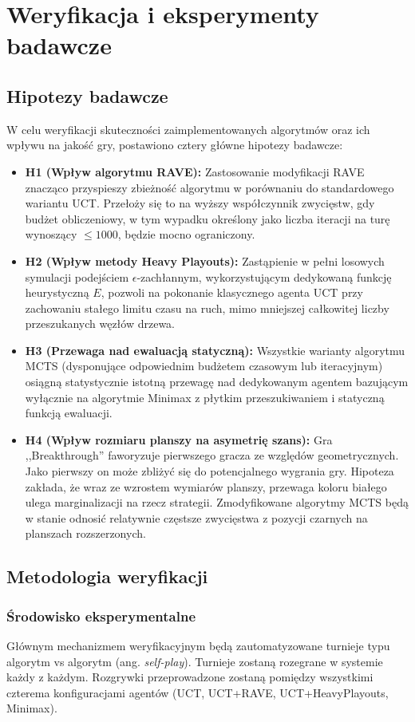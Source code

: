 \documentclass{article}
\begin{document}
\newpage
\section{Weryfikacja i eksperymenty badawcze}
\subsection{Hipotezy badawcze}
W celu weryfikacji skuteczności zaimplementowanych algorytmów oraz ich wpływu na jakość gry, postawiono cztery główne hipotezy badawcze:

\begin{itemize}
    \item \textbf{H1 (Wpływ algorytmu RAVE):} Zastosowanie modyfikacji RAVE znacząco przyspieszy zbieżność algorytmu w porównaniu do standardowego wariantu UCT. Przełoży się to na wyższy współczynnik zwycięstw, gdy budżet obliczeniowy, w tym wypadku określony jako liczba iteracji na turę wynoszący $\le 1000$, będzie mocno ograniczony.
    \item \textbf{H2 (Wpływ metody Heavy Playouts):} Zastąpienie w pełni losowych symulacji podejściem $\epsilon$-zachłannym, wykorzystującym dedykowaną funkcję heurystyczną $E$, pozwoli na pokonanie klasycznego agenta UCT przy zachowaniu stałego limitu czasu na ruch, mimo mniejszej całkowitej liczby przeszukanych węzłów drzewa.
    \item \textbf{H3 (Przewaga nad ewaluacją statyczną):} Wszystkie warianty algorytmu MCTS (dysponujące odpowiednim budżetem czasowym lub iteracyjnym) osiągną statystycznie istotną przewagę nad dedykowanym agentem bazującym wyłącznie na algorytmie Minimax z płytkim przeszukiwaniem i statyczną funkcją ewaluacji.
    \item \textbf{H4 (Wpływ rozmiaru planszy na asymetrię szans):} Gra ,,Breakthrough'' faworyzuje pierwszego gracza ze względów geometrycznych. Jako pierwszy on może zbliżyć się do potencjalnego wygrania gry. Hipoteza zakłada, że wraz ze wzrostem wymiarów planszy, przewaga koloru białego ulega marginalizacji na rzecz strategii. Zmodyfikowane algorytmy MCTS będą w stanie odnosić relatywnie częstsze zwycięstwa z pozycji czarnych na planszach rozszerzonych.
\end{itemize}
\subsection{Metodologia weryfikacji}
\subsubsection{Środowisko eksperymentalne}
Głównym mechanizmem weryfikacyjnym będą zautomatyzowane turnieje typu algorytm vs algorytm (ang. \textit{self-play}). Turnieje zostaną rozegrane w systemie każdy z każdym. Rozgrywki przeprowadzone zostaną pomiędzy wszystkimi czterema konfiguracjami agentów (UCT, UCT+RAVE, UCT+HeavyPlayouts, Minimax).
\end{document}

